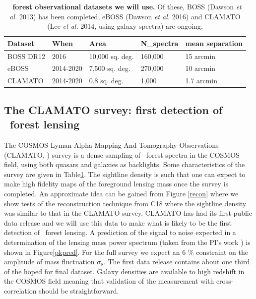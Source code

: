 \begin{table}
\begin{tabular}{|l|l|l|l|l|}
\hline
Dataset   & When      & Area            & N_{\rm spectra} & mean separation \\ \hline
BOSS DR12 & 2016      & 10,000 sq. deg. & 160,000            & 15 arcmin       \\
eBOSS     & 2014-2020 & 7,500 sq. deg.  & 270,000            & 10 arcmin       \\
CLAMATO   & 2014-2020 & 0.8 sq. deg.    & 1,000              & 1.7 arcmin      \\
\hline
\end{tabular}
\centering
\caption{ \footnotesize
{\bf \lya\ forest observational
datasets we will use.} 
Of these, BOSS (Dawson {\it et al.} 2013) has been completed,
eBOSS (Dawson {\it et al.} 2016) and CLAMATO (Lee {\it et al.} 2014, using
galaxy spectra) are ongoing. }
\label{obs}
\end{table}



\subsection{The CLAMATO survey: first detection of \lya\ forest lensing}

The COSMOS Lyman-Alpha Mapping And Tomography Observations (CLAMATO,
\cite{clamato})
 survey is a dense sampling of \lya\ forest spectra in the
COSMOS field, using both quasars and galaxies as backlights.
Some characteristics of the survey are given in Table\ref{obs}. The
sightline density is such that one can expect to make high
fidelity maps of the foreground lensing mass once the survey is completed.
An approximate idea can be gained from Figure \ref{recon} where we show
tests of the reconstruction technique from C18 where the sightline
density was similar to that in the CLAMATO survey. 
CLAMATO has had its first public data release \cite{clamato} and
we will use this data to make what is likely to be the first 
detection of \lya\ forest lensing. A prediction of the 
signal to noise expected in a determination of the lensing mass power spectrum
(taken from the PI's work 
\cite{metcalfandcroft}) is shown in Figure\ref{pkpred}. For
the full survey we expect an 6 \%  constraint on the amplitude
of mass fluctuation $\sigma_{8}$. The first data release contains about
one third of the hoped for final dataset. Galaxy densities are available
to high redshift in the COSMOS field meaning that validation of the
measurement with cross-correlation should be straightforward.

